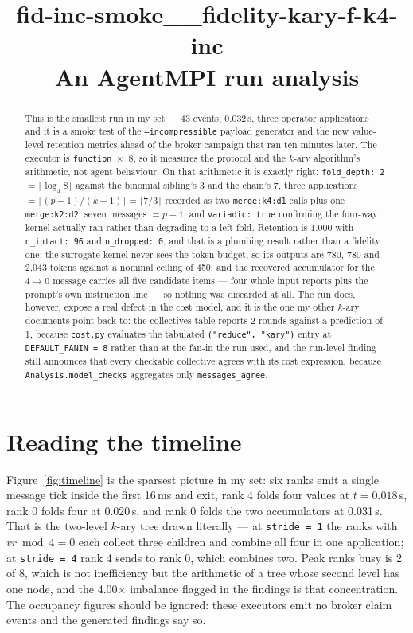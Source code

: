 \documentclass[11pt]{article}
\title{\textbf{fid-inc-smoke\_\_fidelity-kary-f-k4-inc}\\[2pt]\large An AgentMPI run analysis}
\author{}
\date{}
\begin{document}
\maketitle

\begin{abstract}
This is the smallest run in my set --- 43 events, 0.032\,s, three operator applications ---
and it is a smoke test of the \texttt{--incompressible} payload generator and the new
value-level retention metrics ahead of the broker campaign that ran ten minutes later. The
executor is \texttt{function}~$\times$~8, so it measures the protocol and the $k$-ary
algorithm's arithmetic, not agent behaviour. On that arithmetic it is exactly right:
\texttt{fold\_depth: 2} $= \lceil\log_4 8\rceil$ against the binomial sibling's 3 and the
chain's 7, three applications $= \lceil (p-1)/(k-1)\rceil = \lceil 7/3\rceil$ recorded as
two \texttt{merge:k4:d1} calls plus one \texttt{merge:k2:d2}, seven messages $= p-1$, and
\texttt{variadic: true} confirming the four-way kernel actually ran rather than degrading to
a left fold. Retention is 1.000 with \texttt{n\_intact: 96} and \texttt{n\_dropped: 0}, and
that is a plumbing result rather than a fidelity one: the surrogate kernel never sees the
token budget, so its outputs are 780, 780 and 2{,}043 tokens against a nominal ceiling of
450, and the recovered accumulator for the $4\to0$ message carries all five candidate items
--- four whole input reports plus the prompt's own instruction line --- so nothing was
discarded at all. The run does, however, expose a real defect in the cost model, and it is
the one my other $k$-ary documents point back to: the collectives table reports 2 rounds
against a prediction of 1, because \texttt{cost.py} evaluates the tabulated \texttt{("reduce",
"kary")} entry at \texttt{DEFAULT\_FANIN = 8} rather than at the fan-in the run used, and the
run-level finding still announces that every checkable collective agrees with its cost
expression, because \texttt{Analysis.model\_checks} aggregates only \texttt{messages\_agree}.
\end{abstract}



\section{Reading the timeline}

Figure~\ref{fig:timeline} is the sparsest picture in my set: six ranks emit a single message
tick inside the first 16\,ms and exit, rank 4 folds four values at $t=0.018$\,s, rank 0 folds
four at 0.020\,s, and rank 0 folds the two accumulators at 0.031\,s. That is the two-level
$k$-ary tree drawn literally --- at \texttt{stride = 1} the ranks with $vr \bmod 4 = 0$ each
collect three children and combine all four in one application; at \texttt{stride = 4} rank 4
sends to rank 0, which combines two. Peak ranks busy is 2 of 8, which is not inefficiency but
the arithmetic of a tree whose second level has one node, and the 4.00$\times$ imbalance
flagged in the findings is that concentration. The occupancy figures should be ignored: these
executors emit no broker claim events and the generated findings say so.
\end{document}
